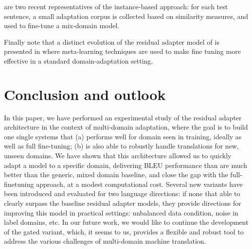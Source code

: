 \documentclass[11pt,a4paper]{article}
\newcommand{\mpDone}[1]{\done[MP]\Todo[MP:]{\textcolor{green}{#1}}}
\begin{document}
\citet{Farajian17multidomain,li-etal-2018-one} are two recent representatives of the instance-based approach: for each test sentence, a small adaptation corpus is collected based on similarity measures, and used to fine-tune a mix-domain model.

Finally note that a distinct evolution of the residual adapter model of \cite{Bapna19simple} is presented in \cite{Sharaf20metalearning} where meta-learning techniques are used to make fine tuning more effective in a standard domain-adaptation setting.

\section{Conclusion and outlook \label{sec:discussion}}
\mpDone{discussion}
In this paper, we have performed an experimental study of the residual adapter architecture in the context of multi-domain adaptation, where the goal is to build one single systems that (a) performs well for domain seen in training, ideally as well as full fine-tuning; (b) is also able to robustly handle translations for new, unseen domains. We have shown that this architecture allowed us to quickly adapt a model to a specific domain, delivering BLEU performance than are much better than the generic, mixed domain baseline, and close the gap with the full-finetuning approach, at a modest computational cost. Several new variants have been introduced and evaluated for two language directions: if none that able to clearly surpass the baseline residual adapter models, they provide directions for improving this model in practical settings: unbalanced data condition, noise in label domains, etc. In our future work, we would like to continue the development of the gated variant, which, it seems to us, provides a flexible and robust tool to address the various challenges of multi-domain machine translation. 

\end{document}
